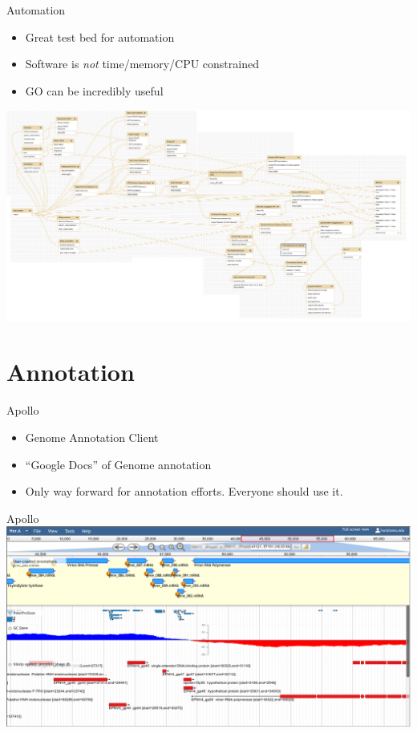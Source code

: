 \documentclass[12pt]{beamer}
\begin{document}
\begin{frame}{Automation}
    \begin{itemize}
        \item Great test bed for automation
        \item Software is \emph{not} time/memory/CPU constrained
        \item GO can be incredibly useful
    \end{itemize}
    \centering
    \includegraphics[width=\textwidth]{./pap2016.png}
\end{frame}


\section{Annotation}


\begin{frame}{Apollo}
    \begin{itemize}
        \item Genome Annotation Client
        \item ``Google Docs'' of Genome annotation
        \item Only way forward for annotation efforts. Everyone should use it.
    \end{itemize}
\end{frame}

\begin{frame}{Apollo}
    \centering
    \includegraphics[width=\textwidth]{./apollo.png}
\end{frame}
\end{document}
